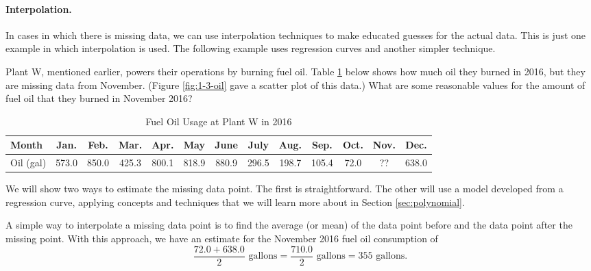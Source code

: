 \paragraph{Interpolation.} In cases in which there is missing data, we can use interpolation techniques to make educated guesses for the actual data. This is just one example in which interpolation is used. The following example uses regression curves and another simpler technique.

\begin{example}
\label{ex:interpolation}
Plant W, mentioned earlier, powers their operations by burning fuel oil. Table \ref{tab:1-3-oil} below shows how much oil they burned in 2016, but they are missing data from November. (Figure \ref{fig:1-3-oil} gave a scatter plot of this data.) What are some reasonable values for the amount of fuel oil that they burned in November 2016?

\begin{table}[h!]
\centering
\begin{tabular}{l*{12}{c}}
\toprule
Month & Jan. & Feb. & Mar. & Apr. & May & June & July & Aug. & Sep. & Oct. & Nov. & Dec. \\
\midrule
Oil (gal) & 573.0 & 850.0 &  425.3 & 800.1  & 818.9 &  880.9 &  296.5 & 198.7 & 105.4 & 72.0 & ?? & 638.0\\
\bottomrule
\end{tabular}
\caption{Fuel Oil Usage at Plant W in 2016}
\label{tab:1-3-oil}
\end{table}
\begin{solution} We will show two ways to estimate the missing data point. The first is straightforward. The other will use a model developed from a regression curve, applying concepts and techniques that we will learn more about in Section \ref{sec:polynomial}.

A simple way to interpolate a missing data point is to find the average (or mean) of the data point before and the data point after the missing point. With this approach, we have an estimate for the November 2016 fuel oil consumption of
$$\frac{72.0 + 638.0}{2} \mbox{ gallons} = \frac{710.0}{2} \mbox{ gallons} = 355 \mbox{ gallons.}$$


\end{solution}
\end{example}

